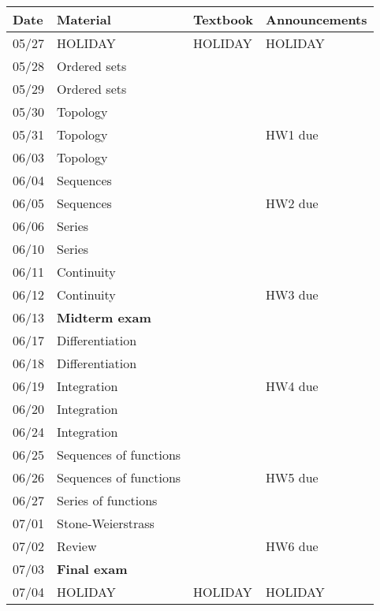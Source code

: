 \documentclass[12pt]{article}
\begin{document}
\begin{tabular}{| l | l | l | l |}\hline
Date & Material & Textbook & Announcements \\ \hline\hline
05/27 & HOLIDAY &  HOLIDAY  & HOLIDAY \\
05/28 & Ordered sets &  &  \\
05/29 & Ordered sets &  &  \\
05/30 & Topology &  &  \\
05/31 & Topology &  & HW1 due \\ \hline \hline  
06/03 & Topology &  &  \\
06/04 & Sequences &  &   \\
06/05 & Sequences &  & HW2 due \\
06/06 & Series &  &  \\ \hline \hline 
06/10 & Series &  &   \\
06/11 & Continuity &  &  \\
06/12 & Continuity &  & HW3 due \\
06/13 & \textbf{Midterm exam} &  &  \\ \hline \hline 
06/17 & Differentiation &  &  \\ 
06/18 & Differentiation &  &  \\
06/19 & Integration &  & HW4 due \\
06/20 & Integration &  &  \\ \hline \hline 
06/24 & Integration &  &  \\
06/25 & Sequences of functions &  & \\
06/26 & Sequences of functions &  & HW5 due \\
06/27 & Series of functions &  &  \\ \hline \hline 
07/01 & Stone-Weierstrass &  &  \\
07/02 & Review & & HW6 due \\
07/03 & \textbf{Final exam} & &   \\
07/04 & HOLIDAY & HOLIDAY & HOLIDAY \\ \hline
\end{tabular}
\end{document}
